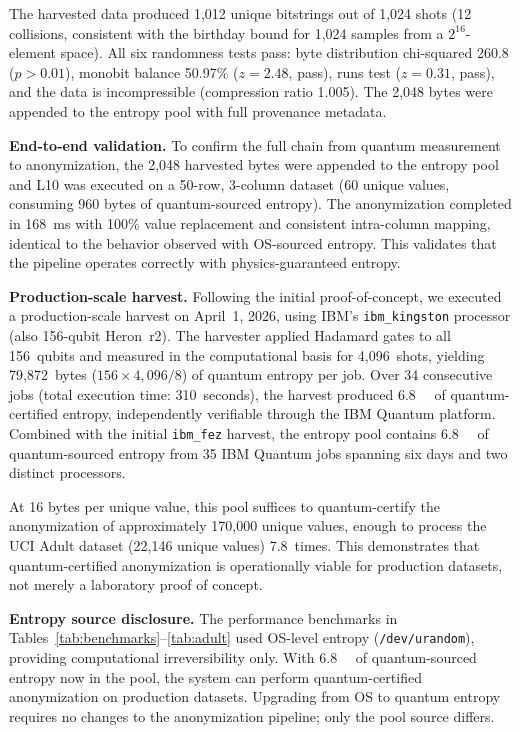 \documentclass[journal]{IEEEtran}
\begin{document}
The harvested data produced 1,012 unique bitstrings out of 1,024 shots (12 collisions, consistent with the birthday bound for 1,024 samples from a $2^{16}$-element space). All six randomness tests pass: byte distribution chi-squared 260.8 ($p > 0.01$), monobit balance 50.97\% ($z = 2.48$, pass), runs test ($z = 0.31$, pass), and the data is incompressible (compression ratio 1.005). The 2,048 bytes were appended to the entropy pool with full provenance metadata.

\textbf{End-to-end validation.} To confirm the full chain from quantum measurement to anonymization, the 2,048 harvested bytes were appended to the entropy pool and L10 was executed on a 50-row, 3-column dataset (60 unique values, consuming 960 bytes of quantum-sourced entropy). The anonymization completed in 168~ms with 100\% value replacement and consistent intra-column mapping, identical to the behavior observed with OS-sourced entropy. This validates that the pipeline operates correctly with physics-guaranteed entropy.

\textbf{Production-scale harvest.} Following the initial proof-of-concept, we executed a production-scale harvest on April~1, 2026, using IBM's \texttt{ibm\_kingston} processor (also 156-qubit Heron~r2). The harvester applied Hadamard gates to all 156~qubits and measured in the computational basis for 4,096~shots, yielding 79,872~bytes ($156 \times 4{,}096 / 8$) of quantum entropy per job. Over 34 consecutive jobs (total execution time: 310~seconds), the harvest produced \SI{6.8}{\mega\byte} of quantum-certified entropy, independently verifiable through the IBM Quantum platform. Combined with the initial \texttt{ibm\_fez} harvest, the entropy pool contains \SI{6.8}{\mega\byte} of quantum-sourced entropy from 35 IBM Quantum jobs spanning six days and two distinct processors.

At 16 bytes per unique value, this pool suffices to quantum-certify the anonymization of approximately 170,000 unique values, enough to process the UCI Adult dataset (22,146 unique values) 7.8~times. This demonstrates that quantum-certified anonymization is operationally viable for production datasets, not merely a laboratory proof of concept.

\textbf{Entropy source disclosure.} The performance benchmarks in Tables~\ref{tab:benchmarks}--\ref{tab:adult} used OS-level entropy (\texttt{/dev/urandom}), providing computational irreversibility only. With \SI{6.8}{\mega\byte} of quantum-sourced entropy now in the pool, the system can perform quantum-certified anonymization on production datasets. Upgrading from OS to quantum entropy requires no changes to the anonymization pipeline; only the pool source differs.
\end{document}
